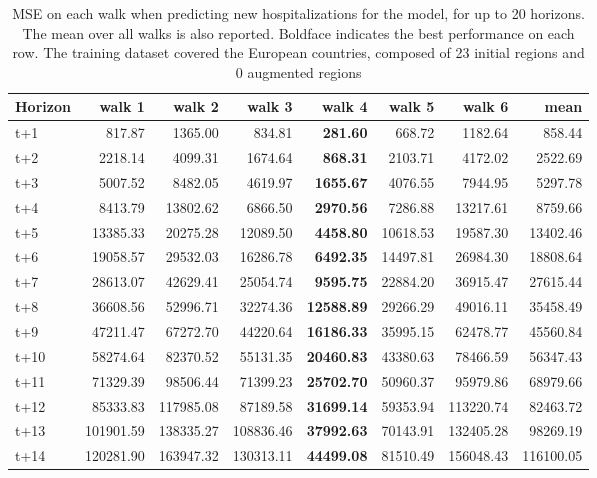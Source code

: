 \begin{table}[H]
\centering
\caption{MSE on each walk when predicting new hospitalizations for the model, for up to 20 horizons. The mean over all walks is also reported. Boldface indicates the best performance on each row. The training dataset covered the European countries, composed of 23 initial regions and 0 augmented regions }
\label{tab:MSE_walk_custom_linear_regression}
\begin{tabular}{lrrrrrrr}
\toprule
Horizon &    walk 1 &    walk 2 &    walk 3 &   walk 4 &    walk 5 &    walk 6 &      mean \\
\midrule
t+1  & 817.87  & 1365.00  & 834.81  & \textbf{281.60}  & 668.72  & 1182.64  & 858.44  \\
t+2  & 2218.14  & 4099.31  & 1674.64  & \textbf{868.31}  & 2103.71  & 4172.02  & 2522.69  \\
t+3  & 5007.52  & 8482.05  & 4619.97  & \textbf{1655.67}  & 4076.55  & 7944.95  & 5297.78  \\
t+4  & 8413.79  & 13802.62  & 6866.50  & \textbf{2970.56}  & 7286.88  & 13217.61  & 8759.66  \\
t+5  & 13385.33  & 20275.28  & 12089.50  & \textbf{4458.80}  & 10618.53  & 19587.30  & 13402.46  \\
t+6  & 19058.57  & 29532.03  & 16286.78  & \textbf{6492.35}  & 14497.81  & 26984.30  & 18808.64  \\
t+7  & 28613.07  & 42629.41  & 25054.74  & \textbf{9595.75}  & 22884.20  & 36915.47  & 27615.44  \\
t+8  & 36608.56  & 52996.71  & 32274.36  & \textbf{12588.89}  & 29266.29  & 49016.11  & 35458.49  \\
t+9  & 47211.47  & 67272.70  & 44220.64  & \textbf{16186.33}  & 35995.15  & 62478.77  & 45560.84  \\
t+10  & 58274.64  & 82370.52  & 55131.35  & \textbf{20460.83}  & 43380.63  & 78466.59  & 56347.43  \\
t+11  & 71329.39  & 98506.44  & 71399.23  & \textbf{25702.70}  & 50960.37  & 95979.86  & 68979.66  \\
t+12  & 85333.83  & 117985.08  & 87189.58  & \textbf{31699.14}  & 59353.94  & 113220.74  & 82463.72  \\
t+13  & 101901.59  & 138335.27  & 108836.46  & \textbf{37992.63}  & 70143.91  & 132405.28  & 98269.19  \\
t+14  & 120281.90  & 163947.32  & 130313.11  & \textbf{44499.08}  & 81510.49  & 156048.43  & 116100.05  \\

\end{tabular}
\end{table}
